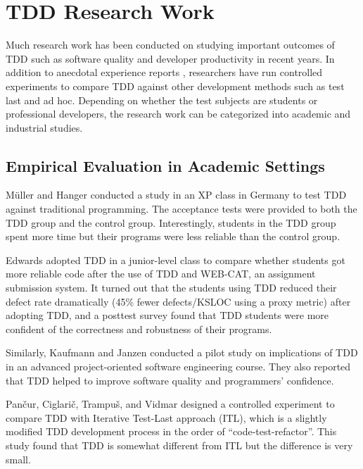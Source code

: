 \documentclass[smallextended]{svjour3}     %
\begin{document}
\section{TDD Research Work}
\label{sec:related-empirical}

Much research work has been conducted on studying important
outcomes of TDD such as software quality and developer productivity 
in recent years. In addition to anecdotal experience reports
\cite{George:04,Maximilien:03,Williams:03,Kaufmann:03,Edwards:04,Bhat:06}, 
researchers have run controlled experiments 
\cite{Muller:02,Matjaz:03,Erdogmus:05} to compare TDD against other 
development methods such as test last and ad hoc. Depending on whether
the test subjects are students or professional developers, the research
work can be categorized into academic and industrial studies.

\subsection{Empirical Evaluation in Academic Settings}

M\"{u}ller and Hanger \cite{Muller:02} conducted a study in an 
XP class in Germany to test TDD against traditional programming. 
The acceptance tests were provided 
to both the TDD group and the control group. Interestingly, students 
in the TDD group spent more time but their programs were less reliable 
than the control group.  

Edwards \cite{Edwards:04} adopted TDD in a junior-level class to compare
whether students got more reliable code after the use of TDD and WEB-CAT,
an assignment submission system. It turned out that the students using TDD
reduced their defect rate dramatically (45\% fewer defects/KSLOC using a
proxy metric) after adopting TDD, and a posttest survey found that TDD
students were more confident of the correctness and robustness of their
programs.

Similarly, Kaufmann and Janzen \cite{Kaufmann:03} conducted a pilot study 
on implications of TDD in an advanced project-oriented software 
engineering course. They also reported that TDD helped to improve software 
quality and programmers' confidence.

Pan\v{c}ur, Ciglari\v{c}, Trampu\v{s}, and Vidmar \cite{Matjaz:03} designed 
a controlled experiment to compare TDD with Iterative Test-Last approach 
(ITL), which is a slightly modified TDD development process in the order 
of ``code-test-refactor''.  This study
found that TDD is somewhat different from ITL but the difference is very
small. 
\end{document}
